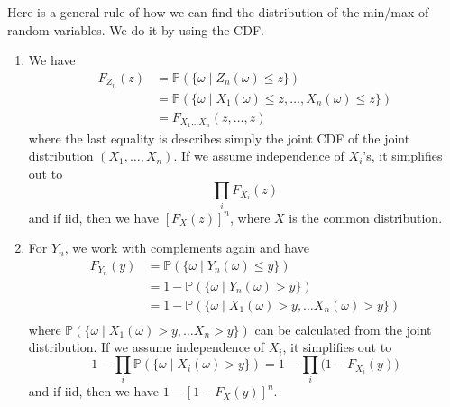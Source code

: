   Here is a general rule of how we can find the distribution of the min/max of random variables. We do it by using the CDF. 
  \begin{enumerate}
    \item We have 
    \begin{align*}
      F_{Z_n} (z) & = \mathbb{P}(\{ \omega \mid Z_n (\omega) \leq z \}) \\
      & = \mathbb{P}(\{ \omega \mid X_1 (\omega) \leq z, \ldots, X_n (\omega) \leq z\}) \\
      & = F_{X_1 \ldots X_n} (z, \ldots, z)
    \end{align*}
    where the last equality is describes simply the joint CDF of the joint distribution $(X_1, \ldots, X_n)$. If we assume independence of $X_i$'s, it simplifies out to 
    \begin{equation}
      \prod_{i} F_{X_i} (z)
    \end{equation}
    and if iid, then we have $[F_{X} (z) ]^n$, where $X$ is the common distribution. 
    \item For $Y_n$, we work with complements again and have 
    \begin{align*}
      F_{Y_n} (y) & = \mathbb{P}(\{ \omega \mid Y_n (\omega) \leq y \}) \\ 
      & = 1 - \mathbb{P}(\{ \omega \mid Y_n (\omega) > y \}) \\
      & = 1 - \mathbb{P}(\{ \omega \mid X_1 (\omega) > y, \ldots X_n (\omega) > y \}) \\
    \end{align*}
    where $\mathbb{P}(\{ \omega \mid X_1 (\omega) > y, \ldots X_n > y \})$ can be calculated from the joint distribution. If we assume independence of $X_i$, it simplifies out to 
    \begin{equation}
      1 - \prod_{i} \mathbb{P}(\{\omega \mid X_i(\omega) > y \}) = 1 - \prod_{i} \big( 1 - F_{X_i} (y) \big)
    \end{equation}
    and if iid, then we have $1 - [1 - F_{X} (y)]^n$. 
  \end{enumerate}

